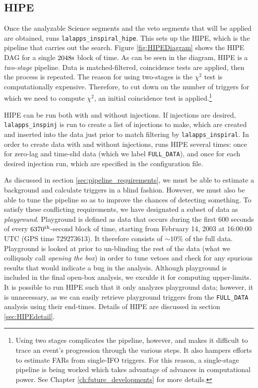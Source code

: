 \subsection{HIPE}
\label{sec:hipe_overview}

Once the analyzable Science segments and the veto segments that will be applied
are obtained, \ihope runs \texttt{lalapps\_inspiral\_hipe}. This sets up the
\ac{HIPE}, which is the pipeline that carries out the search. Figure
\ref{fig:HIPEDiagram} shows the \ac{HIPE} \ac{DAG} for a single $2048\rm{s}$
block of time. As can be seen in the diagram, \ac{HIPE} is a \emph{two-stage}
pipeline. Data is matched-filtered, coincidence tests are applied, then the
process is repeated. The reason for using two-stages is the $\chi^2$ test is
computationally expensive. Therefore, to cut down on the number of triggers for
which we need to compute $\chi^2$, an initial coincidence test is
applied.\footnote{Using two stages complicates the pipeline, however, and makes
it difficult to trace an event's progression through the various steps. It also
hampers efforts to estimate \acp{FAR} from single-\ac{IFO} triggers. For this
reason, a single-stage pipeline is being worked which takes advantage of
advances in computational power. See Chapter \ref{ch:future_developments} for
more details.}

\ac{HIPE} can be run both with and without injections. If injections are
desired, \texttt{lalapps\_inspinj} is run to create a list of injections to
make, which are created and inserted into the data just prior to match
filtering by \texttt{lalapps\_inspiral}. In order to create data with and
without injections, \ihope runs \ac{HIPE} several times: once for zero-lag and
time-slid data (which we label \texttt{FULL\_DATA}), and once for each desired
injection run, which are specified in the configuration file.

As discussed in section \ref{sec:pipeline_requirements}, we must be able to
estimate a background and calculate triggers in a blind fashion. However, we
must also be able to tune the pipeline so as to improve the chances of
detecting something. To satisfy these conflicting requirements, we have
designated a subset of data as \emph{playground}. Playground is defined as data
that occurs during the first $600$ seconds of every $6370^{\mathrm{th}}$-second block of
time, starting from February 14, 2003 at 16:00:00 UTC (GPS time $729273613$).
It therefore consists of $\sim10\%$ of the full data. Playground is looked at
prior to un-blinding the rest of the data (what we colliquoly call
\emph{opening the box}) in order to tune vetoes and check for any spurious
results that would indicate a bug in the analysis. Although playground is
included in the final open-box analysis, we exculde it for computing
upper-limits. It is possible to run \ac{HIPE} such that it only analyzes
playground data; however, it is unnecessary, as we can easily retrieve
playground triggers from the \texttt{FULL\_DATA} analysis using their
end-times. Details of \ac{HIPE} are discussed in section \ref{sec:HIPEdetail}.

